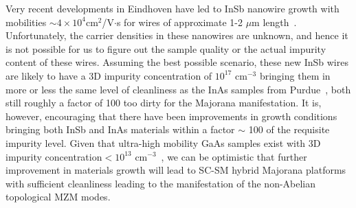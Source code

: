 \documentclass[aps,prmaterials,twocolumn,superscriptaddress,longbibliography]{revtex4-2}
\begin{document}
Very recent developments in Eindhoven have led to InSb nanowire growth with mobilities $\sim 4\times10^4 $cm$ ^2 $/V$ \cdot$s  for wires of approximate 1-2 $\mu$m length~\cite{badawy2019high}.  Unfortunately, the carrier densities in these nanowires are unknown, and hence it is not possible for us to figure out the sample quality or the actual impurity content of these wires.  Assuming the best possible scenario, these new InSb wires are likely to have a 3D impurity concentration of $10^{17}$  cm$^{-3}$  bringing them in more or less the same level of cleanliness as the InAs samples from Purdue~\cite{pauka2020repairing}, both still roughly a factor of 100 too dirty for the Majorana manifestation.  It is, however, encouraging that there have been improvements in growth conditions bringing both InSb and InAs materials within a factor $\sim $ 100 of the requisite impurity level.  Given that ultra-high mobility GaAs samples exist with 3D impurity concentration$ < 10^{13}$ cm$^{-3}$~\cite{chung2021ultrahighquality}, we can be optimistic that further improvement in materials growth will lead to SC-SM hybrid Majorana platforms with sufficient cleanliness leading to the manifestation of the non-Abelian topological MZM modes.
\end{document}
